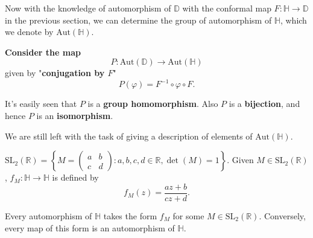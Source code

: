 \documentclass{article}
\begin{document}
Now with the knowledge of automorphism of $\mathbb{D}$ with the conformal map $F: \mathbb{H} \to \mathbb{D}$ in the previous section, we can determine the group of automorphism of $\mathbb{H}$, which we denote by $\text{Aut}(\mathbb{H})$.

\textbf{Consider the map}
$$P: \text{Aut}(\mathbb{D}) \to \text{Aut}(\mathbb{H})$$
given by "\textbf{conjugation by $F$}"
$$P(\varphi) = F^{-1} \circ \varphi \circ F.$$

It's easily seen that $P$ is a \textbf{group homomorphism}.
Also $P$ is a \textbf{bijection}, and hence $P$ is an \textbf{isomorphism}.

We are still left with the task of giving a description of elements of $\text{Aut}(\mathbb{H})$.

\begin{definition}
$\text{SL}_2(\mathbb{R}) = \left\{ M = \begin{pmatrix} a & b \\ c & d \end{pmatrix} : a, b, c, d \in \mathbb{R}, \det(M) = 1 \right\}$.
Given $M \in \text{SL}_2(\mathbb{R})$, $f_M: \mathbb{H} \to \mathbb{H}$ is defined by
$$f_M(z) = \frac{az + b}{cz + d}.$$
\end{definition}

\begin{theorem}
Every automorphism of $\mathbb{H}$ takes the form $f_M$ for some $M \in \text{SL}_2(\mathbb{R})$. Conversely, every map of this form is an automorphism of $\mathbb{H}$.
\end{theorem}
\end{document}
